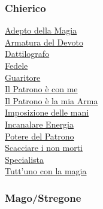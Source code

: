 \begin{multicols}{3}
{\begin{flushleft}
\titlespacing*{\subsubsection}{0pt}{0.5em}{0.5em}\subsubsection*{Chierico}

\hyperlink{Adepto della Magia}{Adepto della Magia}\\
\hyperlink{Armatura del Devoto}{Armatura del Devoto}\\
\hyperlink{Dattilografo}{Dattilografo}\\
\hyperlink{Fedele}{Fedele}\\
\hyperlink{Guaritore}{Guaritore}\\
\hyperlink{Il Patrono è con me}{Il Patrono è con me}\\
\hyperlink{Il Patrono è la mia Arma}{Il Patrono è la mia Arma}\\
\hyperlink{Imposizione delle mani}{Imposizione delle mani}\\
\hyperlink{Incanalare Energia}{Incanalare Energia}\\
\hyperlink{Potere del Patrono}{Potere del Patrono}\\
\hyperlink{Scacciare i non morti}{Scacciare i non morti}\\
\hyperlink{Specialista}{Specialista}\\
\hyperlink{Tutt'uno con la magia}{Tutt'uno con la magia}

\titlespacing*{\subsubsection}{0pt}{0.5em}{0.5em}\subsubsection*{Mago/Stregone}


\end{flushleft}}
\end{multicols}
